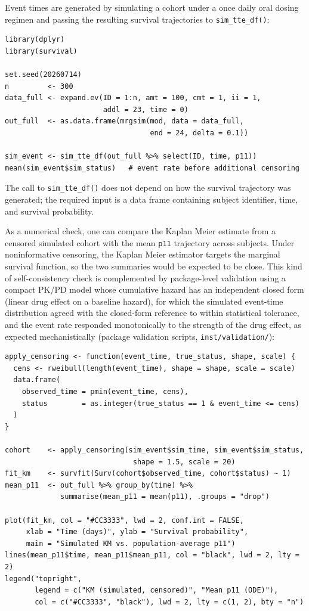 Event times are generated by simulating a cohort under a once daily oral dosing regimen and passing the resulting survival trajectories to \texttt{sim\_tte\_df()}:

\begin{verbatim}
library(dplyr)
library(survival)

set.seed(20260714)
n         <- 300
data_full <- expand.ev(ID = 1:n, amt = 100, cmt = 1, ii = 1,
                       addl = 23, time = 0)
out_full  <- as.data.frame(mrgsim(mod, data = data_full,
                                  end = 24, delta = 0.1))

sim_event <- sim_tte_df(out_full %>% select(ID, time, p11))
mean(sim_event$sim_status)   # event rate before additional censoring
\end{verbatim}

The call to \texttt{sim\_tte\_df()} does not depend on how the survival trajectory was generated; the required input is a data frame containing subject identifier, time, and survival probability.

As a numerical check, one can compare the Kaplan Meier estimate from a censored simulated cohort with the mean \texttt{p11} trajectory across subjects. Under noninformative censoring, the Kaplan Meier estimator targets the marginal survival function, so the two summaries would be expected to be close. This kind of self-consistency check is complemented by package-level validation using a compact PK/PD model whose cumulative hazard has an independent closed form (linear drug effect on a baseline hazard), for which the simulated event-time distribution agreed with the closed-form reference to within statistical tolerance, and the event rate responded monotonically to the strength of the drug effect, as expected mechanistically (package validation scripts, \texttt{inst/validation/}):

\begin{verbatim}
apply_censoring <- function(event_time, true_status, shape, scale) {
  cens <- rweibull(length(event_time), shape = shape, scale = scale)
  data.frame(
    observed_time = pmin(event_time, cens),
    status        = as.integer(true_status == 1 & event_time <= cens)
  )
}

cohort    <- apply_censoring(sim_event$sim_time, sim_event$sim_status,
                              shape = 1.5, scale = 20)
fit_km    <- survfit(Surv(cohort$observed_time, cohort$status) ~ 1)
mean_p11  <- out_full %>% group_by(time) %>%
             summarise(mean_p11 = mean(p11), .groups = "drop")

plot(fit_km, col = "#CC3333", lwd = 2, conf.int = FALSE,
     xlab = "Time (days)", ylab = "Survival probability",
     main = "Simulated KM vs. population-average p11")
lines(mean_p11$time, mean_p11$mean_p11, col = "black", lwd = 2, lty = 2)
legend("topright",
       legend = c("KM (simulated, censored)", "Mean p11 (ODE)"),
       col = c("#CC3333", "black"), lwd = 2, lty = c(1, 2), bty = "n")
\end{verbatim}

